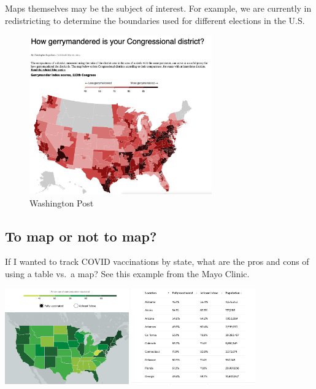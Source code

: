 \documentclass[
  letterpaper,
  DIV=11,
  numbers=noendperiod]{scrreprt}
\begin{document}
Maps themselves may be the subject of interest. For example, we are
currently in redistricting to determine the boundaries used for
different elections in the U.S.

\begin{figure}

{\centering \includegraphics[width=0.7\textwidth,height=\textheight]{images/gerrym.png}

}

\caption{Washington Post}

\end{figure}

\hypertarget{to-map-or-not-to-map}{%
\subsection{To map or not to map?}\label{to-map-or-not-to-map}}

If I wanted to track COVID vaccinations by state, what are the pros and
cons of using a table vs.~a map? See this example from the Mayo Clinic.

\includegraphics[width=0.4\textwidth,height=\textheight]{images/covidvaccmap.png}
\includegraphics[width=0.4\textwidth,height=\textheight]{images/covidvacctab.png}
\end{document}
